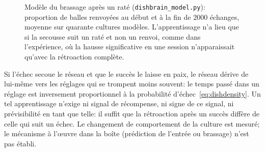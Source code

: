 \begin{figure}[t]
\centering
{}
\caption{Modèle du \og brassage après un raté\fg{} (\texttt{dishbrain\_model.py}): proportion de balles renvoyées au début et à la fin de $2000$ échanges, moyenne sur quarante cultures modèles. L'apprentissage n'a lieu que si la secousse suit un raté et non un renvoi, comme dans l'expérience, où la hausse significative en une session n'apparaissait qu'avec la rétroaction complète.}
\label{fig:dishmodel}
\end{figure}

\begin{keyblock}
\begin{proposition}
\label{prop:dishscramble}
Si l'échec secoue le réseau et que le succès le laisse en paix, le réseau dérive de lui-même vers les réglages qui se trompent moins souvent: le temps passé dans un réglage est inversement proportionnel à la probabilité d'échec~\eqref{eq:dishdensity}. Un tel apprentissage n'exige ni signal de récompense, ni signe de ce signal, ni prévisibilité en tant que telle: il suffit que la rétroaction après un succès diffère de celle qui suit un échec. Le changement de comportement de la culture est mesuré; le mécanisme à l'œuvre dans la boîte (prédiction de l'entrée ou brassage) n'est pas établi.
\end{proposition}
\end{keyblock}


